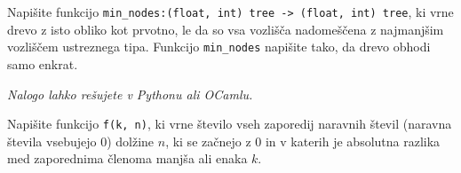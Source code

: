 \documentclass[arhiv]{../izpit}
\begin{document}
   Napišite funkcijo \verb|min_nodes:(float, int) tree -> (float, int) tree|, ki vrne drevo z isto obliko kot prvotno, le da so vsa vozlišča nadomeščena z najmanjšim vozliščem ustreznega tipa. Funkcijo \verb|min_nodes| napišite tako, da drevo obhodi samo enkrat.

  \naloga
  
  \emph{Nalogo lahko rešujete v Pythonu ali OCamlu.}

  \vspace{3mm}
  \noindent
  Napišite funkcijo \verb|f(k, n)|, ki vrne število vseh zaporedij naravnih števil (naravna števila vsebujejo 0) dolžine $n$, ki se začnejo z 0 in v katerih je absolutna razlika med zaporednima členoma manjša ali enaka $k$.
  
	
\end{document}
